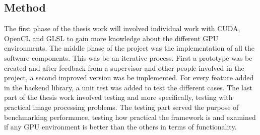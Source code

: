 \subsection{Method}

The first phase of the thesis work will involved individual work with CUDA, OpenCL and GLSL to gain more knowledge about the different GPU environments. The middle phase of the project was the implementation of all the software components. This was be an iterative process. First a prototype was be created and after feedback from a supervisor and other people involved in the project, a second improved version was be implemented. For every feature added in the backend library, a unit test was added to test the different cases. The last part of the thesis work involved testing and more specifically, testing with practical image processing problems. The testing part served the purpose of benchmarking performance, testing how practical the framework is and examined if any GPU environment is better than the others in terms of functionality.
